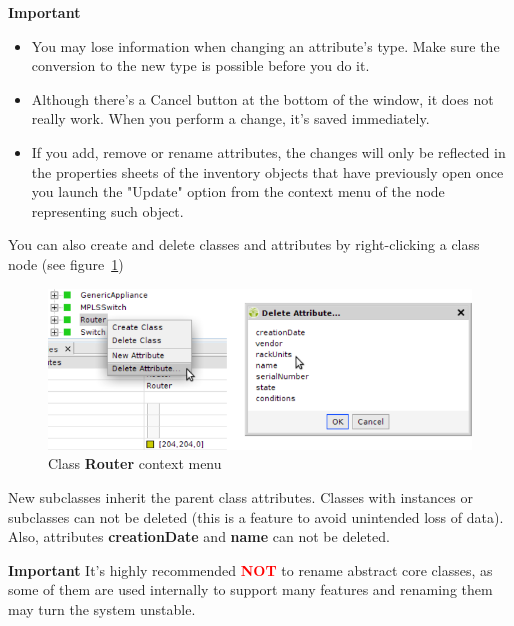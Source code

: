 \documentclass[a4paper]{article}
\begin{document}
			
			\begin{framed} {\large \textbf{Important}}
				\begin{itemize}
					\item You may lose information when changing an attribute's type. Make sure the conversion to the new type is possible before you do it.
					\item Although there's a Cancel button at the bottom of the window, it does not	really work. When you perform a change, it's saved immediately.
					\item If you add, remove or rename attributes, the changes will only be reflected in the properties sheets of the inventory objects that have previously open once you launch the "Update" option from the context menu of the node representing such object.
				\end{itemize}
			\end{framed}
			You can also create and delete classes and attributes by right-clicking a class node (see figure~\ref{fig:class_node_menu})
			\begin{figure}[h!]
				\centering
				\includegraphics[width=0.7\linewidth]{img/class_node_menu.png}
				\caption{Class \textbf{Router} context menu}
				\label{fig:class_node_menu}
			\end{figure}
			New subclasses inherit the parent class attributes. Classes with instances or subclasses can not be deleted (this is  a  feature to avoid unintended loss of data). Also, attributes \textbf{creationDate} and \textbf{name} can not be deleted.
			\begin{framed} {\large \textbf{Important}}
				It's highly recommended \textbf{\textcolor{red}{NOT}} to rename abstract core classes, as some of them are used internally to support many features and renaming them may turn the system unstable.
			\end{framed}
	    \pagebreak
\end{document}
